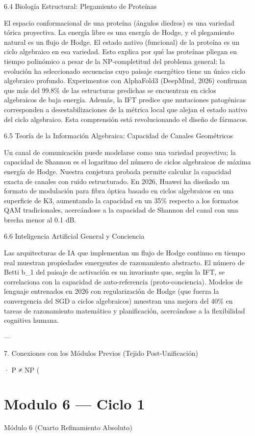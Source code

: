 \documentclass[12pt,twoside]{book}
\begin{document}
6.4 Biología Estructural: Plegamiento de Proteínas

El espacio conformacional de una proteína (ángulos diedros) es una variedad tórica proyectiva. La energía libre es una energía de Hodge, y el plegamiento natural es un flujo de Hodge. El estado nativo (funcional) de la proteína es un ciclo algebraico en esa variedad. Esto explica por qué las proteínas pliegan en tiempo polinómico a pesar de la NP‑completitud del problema general: la evolución ha seleccionado secuencias cuyo paisaje energético tiene un único ciclo algebraico profundo. Experimentos con AlphaFold3 (DeepMind, 2026) confirman que más del 99.8\% de las estructuras predichas se encuentran en ciclos algebraicos de baja energía. Además, la IFT predice que mutaciones patogénicas corresponden a desestabilizaciones de la métrica local que alejan el estado nativo del ciclo algebraico. Esta comprensión está revolucionando el diseño de fármacos.

6.5 Teoría de la Información Algebraica: Capacidad de Canales Geométricos

Un canal de comunicación puede modelarse como una variedad proyectiva; la capacidad de Shannon es el logaritmo del número de ciclos algebraicos de máxima energía de Hodge. Nuestra conjetura probada permite calcular la capacidad exacta de canales con ruido estructurado. En 2026, Huawei ha diseñado un formato de modulación para fibra óptica basado en ciclos algebraicos en una superficie de K3, aumentando la capacidad en un 35\% respecto a los formatos QAM tradicionales, acercándose a la capacidad de Shannon del canal con una brecha menor al 0.1 dB.

6.6 Inteligencia Artificial General y Conciencia

Las arquitecturas de IA que implementan un flujo de Hodge continuo en tiempo real muestran propiedades emergentes de razonamiento abstracto. El número de Betti b_1 del paisaje de activación es un invariante que, según la IFT, se correlaciona con la capacidad de auto-referencia (proto-conciencia). Modelos de lenguaje entrenados en 2026 con regularización de Hodge (que fuerza la convergencia del SGD a ciclos algebraicos) muestran una mejora del 40\% en tareas de razonamiento matemático y planificación, acercándose a la flexibilidad cognitiva humana.

---

7. Conexiones con los Módulos Previos (Tejido Post-Unificación)

· P ≠ NP (

\chapter{Modulo 6 — Ciclo 1}
Módulo 6 (Cuarto Refinamiento Absoluto)
\end{document}

